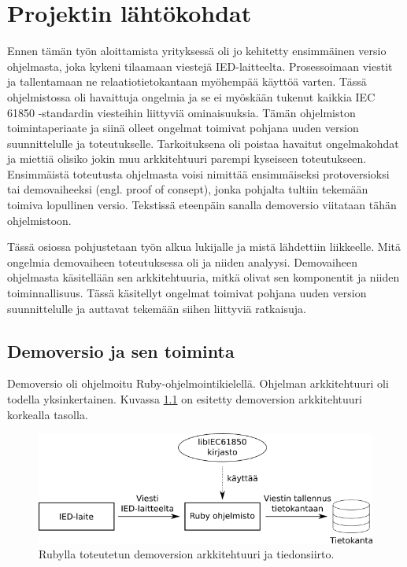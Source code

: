 \chapter{Projektin lähtökohdat}
\label{ch:projektin-lähtökohdat}
Ennen tämän työn aloittamista yrityksessä oli jo kehitetty ensimmäinen versio ohjelmasta, joka kykeni tilaamaan viestejä IED-laitteelta. Prosessoimaan viestit ja tallentamaan ne relaatiotietokantaan myöhempää käyttöä varten. Tässä ohjelmistossa oli havaittuja ongelmia ja se ei myöskään tukenut kaikkia IEC 61850 -standardin viesteihin liittyviä ominaisuuksia. Tämän ohjelmiston toimintaperiaate ja siinä olleet ongelmat toimivat pohjana uuden version suunnittelulle ja toteutukselle. Tarkoituksena oli poistaa havaitut ongelmakohdat ja miettiä olisiko jokin muu arkkitehtuuri parempi kyseiseen toteutukseen. Ensimmäistä toteutusta ohjelmasta voisi nimittää ensimmäiseksi protoversioksi tai demovaiheeksi (engl. proof of consept), jonka pohjalta tultiin tekemään toimiva lopullinen versio. Tekstissä eteenpäin sanalla demoversio viitataan tähän ohjelmistoon.

Tässä osiossa pohjustetaan työn alkua lukijalle ja mistä lähdettiin liikkeelle. Mitä ongelmia demovaiheen toteutuksessa oli ja niiden analyysi. Demovaiheen ohjelmasta käsitellään sen arkkitehtuuria, mitkä olivat sen komponentit ja niiden toiminnallisuus. Tässä käsitellyt ongelmat toimivat pohjana uuden version suunnittelulle ja auttavat tekemään siihen liittyviä ratkaisuja.


\section{Demoversio ja sen toiminta}
\label{ch:demoversio-ja-sen-toiminta}
Demoversio oli ohjelmoitu Ruby-ohjelmointikielellä. Ohjelman arkkitehtuuri oli todella yksinkertainen. Kuvassa \ref{fig:demo-architecture} on esitetty demoversion arkkitehtuuri korkealla tasolla.

\begin{figure}
	\includegraphics[width=1\textwidth]{pictures/demo-architecture.png}
	\caption{Rubylla toteutetun demoversion arkkitehtuuri ja tiedonsiirto.}
	\label{fig:demo-architecture}
\end{figure}

